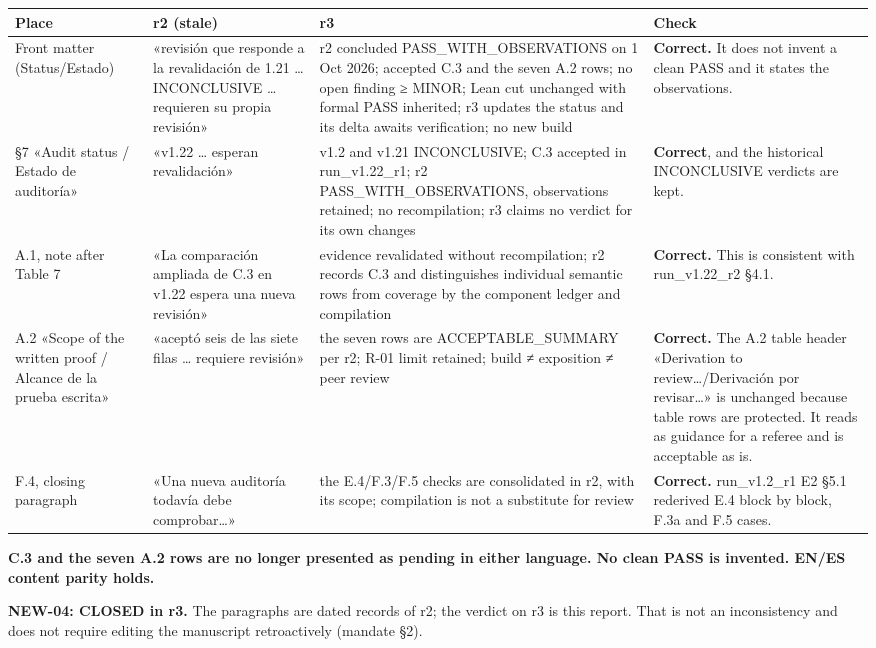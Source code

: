 \documentclass[
]{article}
\newcounter{none} %
\begin{document}
{\def\LTcaptype{none} %
\begin{longtable}[]{@{}llll@{}}
\toprule\noalign{}
Place & r2 (stale) & r3 & Check \\
\midrule\noalign{}
\endhead
\bottomrule\noalign{}
\endlastfoot
Front matter (Status/Estado) & «revisión que responde a la revalidación
de 1.21 \ldots{} INCONCLUSIVE \ldots{} requieren su propia revisión» &
r2 concluded PASS\_WITH\_OBSERVATIONS on 1 Oct 2026; accepted C.3 and
the seven A.2 rows; no open finding ≥ MINOR; Lean cut unchanged with
formal PASS inherited; r3 updates the status and its delta awaits
verification; no new build & \textbf{Correct.} It does not invent a
clean PASS and it states the observations. \\
§7 «Audit status / Estado de auditoría» & «v1.22 \ldots{} esperan
revalidación» & v1.2 and v1.21 INCONCLUSIVE; C.3 accepted in
run\_v1.22\_r1; r2 PASS\_WITH\_OBSERVATIONS, observations retained; no
recompilation; r3 claims no verdict for its own changes &
\textbf{Correct}, and the historical INCONCLUSIVE verdicts are kept. \\
A.1, note after Table 7 & «La comparación ampliada de C.3 en v1.22
espera una nueva revisión» & evidence revalidated without recompilation;
r2 records C.3 and distinguishes individual semantic rows from coverage
by the component ledger and compilation & \textbf{Correct.} This is
consistent with run\_v1.22\_r2 §4.1. \\
A.2 «Scope of the written proof / Alcance de la prueba escrita» &
«aceptó seis de las siete filas \ldots{} requiere revisión» & the seven
rows are ACCEPTABLE\_SUMMARY per r2; R-01 limit retained; build ≠
exposition ≠ peer review & \textbf{Correct.} The A.2 table header
«Derivation to review\ldots/Derivación por revisar\ldots» is unchanged
because table rows are protected. It reads as guidance for a referee and
is acceptable as is. \\
F.4, closing paragraph & «Una nueva auditoría todavía debe
comprobar\ldots» & the E.4/F.3/F.5 checks are consolidated in r2, with
its scope; compilation is not a substitute for review &
\textbf{Correct.} run\_v1.2\_r1 E2 §5.1 rederived E.4 block by block,
F.3a and F.5 cases. \\
\end{longtable}
}

\textbf{C.3 and the seven A.2 rows are no longer presented as pending in
either language. No clean PASS is invented. EN/ES content parity holds.}

\textbf{NEW-04: CLOSED in r3.} The paragraphs are dated records of r2;
the verdict on r3 is this report. That is not an inconsistency and does
not require editing the manuscript retroactively (mandate §2).
\end{document}
